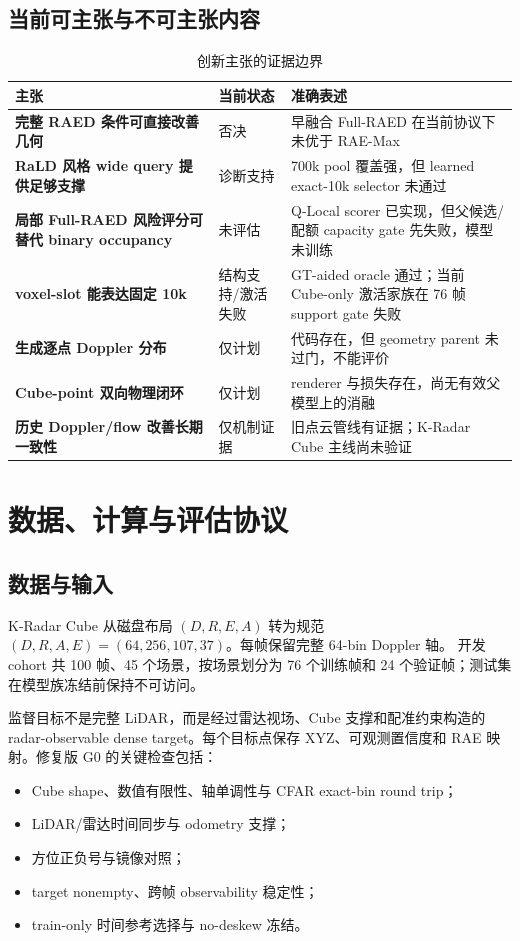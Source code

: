 \documentclass[11pt,a4paper,fontset=none]{ctexart}
\begin{document}
\subsection{当前可主张与不可主张内容}

\begin{table}[H]
\centering
\small
\caption{创新主张的证据边界}
\begin{tabularx}{\textwidth}{>{\bfseries}p{4.0cm} p{2.2cm} Y}
\toprule
主张 & 当前状态 & 准确表述 \\
\midrule
完整 RAED 条件可直接改善几何 & 否决 & 早融合 Full-RAED 在当前协议下未优于 RAE-Max \\
RaLD 风格 wide query 提供足够支撑 & 诊断支持 & 700k pool 覆盖强，但 learned exact-10k selector 未通过 \\
局部 Full-RAED 风险评分可替代 binary occupancy & 未评估 & Q-Local scorer 已实现，但父候选/配额 capacity gate 先失败，模型未训练 \\
voxel-slot 能表达固定 10k & 结构支持/激活失败 & GT-aided oracle 通过；当前 Cube-only 激活家族在 76 帧 support gate 失败 \\
生成逐点 Doppler 分布 & 仅计划 & 代码存在，但 geometry parent 未过门，不能评价 \\
Cube-point 双向物理闭环 & 仅计划 & renderer 与损失存在，尚无有效父模型上的消融 \\
历史 Doppler/flow 改善长期一致性 & 仅机制证据 & 旧点云管线有证据；K-Radar Cube 主线尚未验证 \\
\bottomrule
\end{tabularx}
\end{table}

\section{数据、计算与评估协议}

\subsection{数据与输入}

K-Radar Cube 从磁盘布局 $(D,R,E,A)$ 转为规范
$(D,R,A,E)=(64,256,107,37)$。每帧保留完整 64-bin Doppler 轴。
开发 cohort 共 100 帧、45 个场景，按场景划分为 76 个训练帧和
24 个验证帧；测试集在模型族冻结前保持不可访问。

监督目标不是完整 LiDAR，而是经过雷达视场、Cube 支撑和配准约束构造的
radar-observable dense target。每个目标点保存 XYZ、可观测置信度和
RAE 映射。修复版 G0 的关键检查包括：
\begin{itemize}
  \item Cube shape、数值有限性、轴单调性与 CFAR exact-bin round trip；
  \item LiDAR/雷达时间同步与 odometry 支撑；
  \item 方位正负号与镜像对照；
  \item target nonempty、跨帧 observability 稳定性；
  \item train-only 时间参考选择与 no-deskew 冻结。
\end{itemize}
\end{document}
